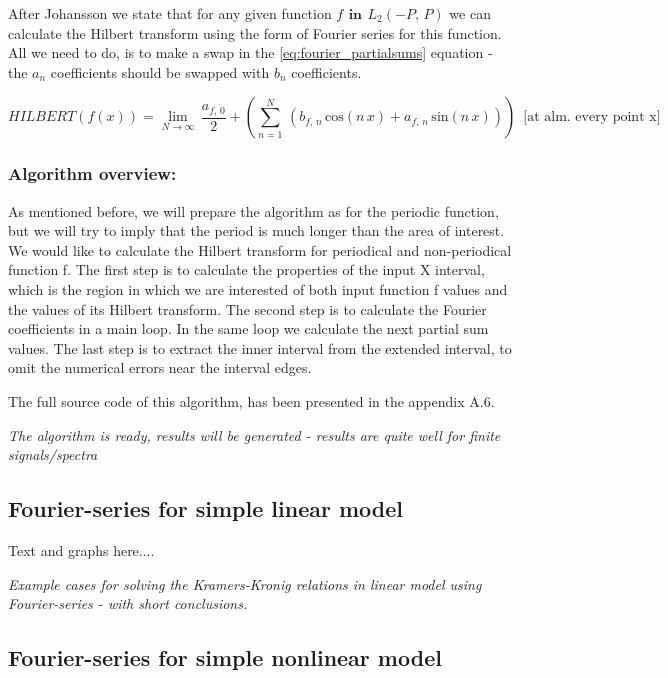 \documentclass[12pt,twoside,a4paper]{article}
\numberwithin{equation}{subsection}
\numberwithin{figure}{subsection}
\begin{document}
After Johansson \cite{johansson_hilbert} we state that for any given function $f\,\ \textbf{in}\ \,{L_{2}}( - P, \,P)$ we can
calculate the Hilbert transform using the form of Fourier series for this function. All we need to do, is to make a swap in the
\ref{eq:fourier_partialsums} equation - the ${a_{n}}$ coefficients should be swapped with ${b_{n}}$ coefficients.

\begin{equation} \label{eq:fourier_hilbert}
  HILBERT(f(x)) = \lim_{N\rightarrow \infty }\,\frac {{a_{f, \,0}}}{2} + (\sum_{ n=1}^{N}\,({b_{f, \,n}}\,\mathrm{cos}(n\,x)
+ {a_{f, \,n}}\, \mathrm{sin}(n\,x)))\,\mbox{ [at alm. every point x] }
\end{equation}

\subsubsection*{Algorithm overview:}

As mentioned before, we will prepare the algorithm as for the periodic function, but we will try to imply that the period is much
longer than the area of interest. We would like to calculate the Hilbert transform for periodical and non-periodical
function f. The first step is to calculate the properties of the input X interval, which is the region in which we are interested
of both input function f values and the values of its Hilbert transform. The second step is to calculate the Fourier coefficients
in a main loop. In the same loop we calculate the next partial sum values. The last step is to extract the inner interval from the
extended interval, to omit the numerical errors near the interval edges.

The full source code of this algorithm, has been presented in the appendix A.6.

\textit{The algorithm is ready, results will be generated - results are quite well for finite signals/spectra}

\subsection{Fourier-series for simple linear model} \label{chap:fourier_lin}

Text and graphs here.... 

\textit{Example cases for solving the Kramers-Kronig relations in linear model using Fourier-series - with short conclusions.}

\subsection{Fourier-series for simple nonlinear model} \label{chap:fourier_nlo}
\end{document}
